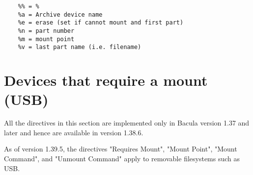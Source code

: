 \footnotesize
\begin{verbatim}
    %% = %
    %a = Archive device name
    %e = erase (set if cannot mount and first part)
    %n = part number
    %m = mount point
    %v = last part name (i.e. filename)
\end{verbatim}
\normalsize


\section{Devices that require a mount (USB)}

All the directives in this section are implemented only in
Bacula version 1.37 and later and hence are available in version 1.38.6.

As of version 1.39.5, the directives
"Requires Mount", "Mount Point", "Mount Command", and "Unmount Command"
apply to removable filesystems such as USB.

